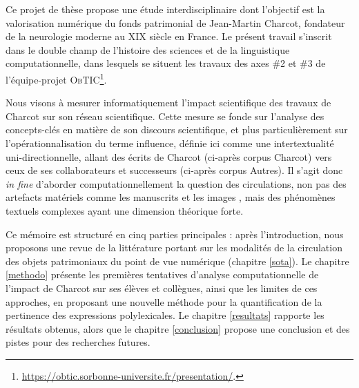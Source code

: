 Ce projet de thèse propose une étude interdisciplinaire dont l'objectif est la valorisation numérique du fonds patrimonial de Jean-Martin Charcot, fondateur de la neurologie moderne au XIX\ieme{} siècle en France. 
Le présent travail s'inscrit dans le double champ de l'histoire des sciences et de la linguistique computationnelle, dans lesquels se situent les travaux des axes \#2 et \#3 de l'équipe-projet \textsc{ObTIC}\footnote{\url{https://obtic.sorbonne-universite.fr/presentation/}.}.

Nous visons à mesurer informatiquement l'impact scientifique des travaux de Charcot sur son réseau scientifique. Cette mesure se fonde sur l'analyse des concepts-clés en matière de son discours scientifique, et plus particulièrement sur l'opérationnalisation du terme \og{}influence\fg{}, définie ici comme une intertextualité uni-directionnelle, allant des écrits de Charcot (ci-après corpus \og{}Charcot\fg{}) vers ceux de ses collaborateurs et successeurs (ci-après corpus \og{}Autres\fg{}). Il s'agit donc \textit{in fine} d'aborder computationnellement la question des circulations, non pas des artefacts matériels comme les manuscrits \citep{gabay2021katabase} et les images \citep{joyeux2019visual}, mais des phénomènes textuels complexes \citep{manjavacas} ayant une dimension théorique forte.

Ce mémoire est structuré en cinq parties principales : après l'introduction, nous proposons une revue de la littérature portant sur les modalités de la circulation des objets patrimoniaux du point de vue numérique (chapitre \ref{sota}). Le chapitre \ref{methodo} présente les premières tentatives d'analyse computationnelle de l'impact de Charcot sur ses élèves et collègues, ainsi que les limites de ces approches, en proposant une nouvelle méthode pour la quantification de la pertinence des expressions polylexicales. Le chapitre \ref{resultats} rapporte les résultats obtenus, alors que le chapitre \ref{conclusion} propose une conclusion et des pistes pour des recherches futures.










